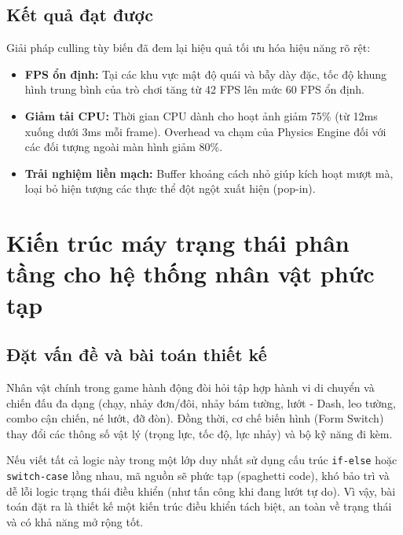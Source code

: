 \subsection{Kết quả đạt được}
Giải pháp culling tùy biến đã đem lại hiệu quả tối ưu hóa hiệu năng rõ rệt:
\begin{itemize}
    \item \textbf{FPS ổn định:} Tại các khu vực mật độ quái và bẫy dày đặc, tốc độ khung hình trung bình của trò chơi tăng từ 42 FPS lên mức 60 FPS ổn định.
    \item \textbf{Giảm tải CPU:} Thời gian CPU dành cho hoạt ảnh giảm 75\% (từ 12ms xuống dưới 3ms mỗi frame). Overhead va chạm của Physics Engine đối với các đối tượng ngoài màn hình giảm 80\%.
    \item \textbf{Trải nghiệm liền mạch:} Buffer khoảng cách nhỏ giúp kích hoạt mượt mà, loại bỏ hiện tượng các thực thể đột ngột xuất hiện (pop-in).
\end{itemize}

\section{Kiến trúc máy trạng thái phân tầng cho hệ thống nhân vật phức tạp}

\subsection{Đặt vấn đề và bài toán thiết kế}
Nhân vật chính trong game hành động đòi hỏi tập hợp hành vi di chuyển và chiến đấu đa dạng (chạy, nhảy đơn/đôi, nhảy bám tường, lướt - Dash, leo tường, combo cận chiến, né lướt, đỡ đòn). Đồng thời, cơ chế biến hình (Form Switch) thay đổi các thông số vật lý (trọng lực, tốc độ, lực nhảy) và bộ kỹ năng đi kèm.

Nếu viết tất cả logic này trong một lớp duy nhất sử dụng cấu trúc \texttt{if-else} hoặc \texttt{switch-case} lồng nhau, mã nguồn sẽ phức tạp (spaghetti code), khó bảo trì và dễ lỗi logic trạng thái điều khiển (như tấn công khi đang lướt tự do). Vì vậy, bài toán đặt ra là thiết kế một kiến trúc điều khiển tách biệt, an toàn về trạng thái và có khả năng mở rộng tốt.

